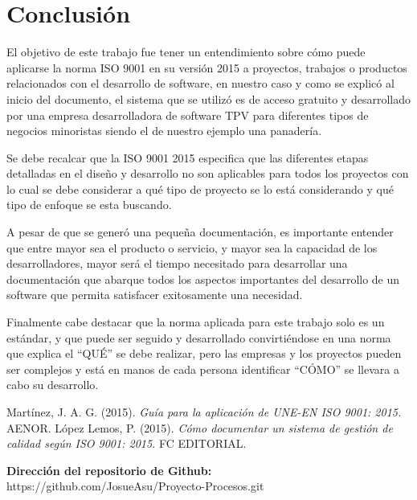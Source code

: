 \documentclass[12pt]{article}
\begin{document}
\newpage

\section{Conclusión}
El objetivo de este trabajo fue tener un entendimiento sobre cómo puede aplicarse la norma ISO 9001 en su versión 2015 a proyectos, trabajos o productos relacionados con el desarrollo de software, en nuestro caso y como se explicó al inicio del documento, el sistema que se utilizó es de acceso gratuito y desarrollado por una empresa desarrolladora de software TPV para diferentes tipos de negocios minoristas siendo el de nuestro ejemplo una panadería. 

Se debe recalcar que la ISO 9001 2015 especifica que las diferentes etapas detalladas en el diseño y desarrollo no son aplicables para todos los  proyectos con lo cual se debe considerar a qué tipo de proyecto se lo está considerando y qué tipo de enfoque se esta buscando.

A pesar de que se generó una pequeña documentación, es importante entender que entre mayor sea el producto o servicio, y mayor sea la capacidad de los desarrolladores, mayor será el tiempo necesitado para desarrollar una documentación que abarque todos los aspectos importantes del desarrollo de un software que permita satisfacer exitosamente una necesidad.
 
Finalmente cabe destacar que la norma aplicada para este trabajo solo es un estándar, y que puede ser seguido y desarrollado convirtiéndose en una norma  que explica el ``QUÉ'' se debe realizar, pero las empresas y los proyectos pueden ser complejos y está en manos de cada persona identificar ``CÓMO'' se llevara a cabo su desarrollo.

\newpage
\renewcommand{\refname}{Bibliografía}
\renewcommand{\bibname}{References}
\begin{thebibliography}{12}
	 Martínez, J. A. G. (2015). \emph{Guía para la aplicación de UNE-EN ISO 9001: 2015.} AENOR.
	 López Lemos, P. (2015). \emph{Cómo documentar un sistema de gestión de calidad según ISO 9001: 2015.} FC EDITORIAL.
\end{thebibliography}

\textbf{Dirección del repositorio de Github:}\\
https://github.com/JosueAsu/Proyecto-Procesos.git
\end{document}
